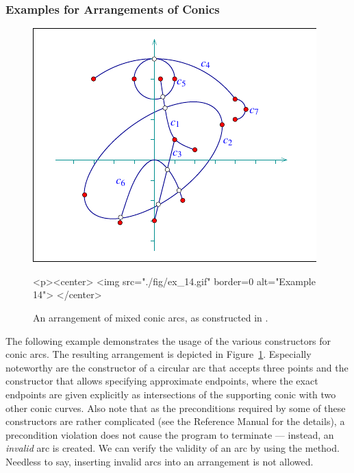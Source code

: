 \subsubsection{Examples for Arrangements of Conics}

\begin{figure}[t]
\begin{ccTexOnly}
  \begin{center}
  \includegraphics{Arrangement_on_surface_2/fig/ex_14}
  \end{center}
\end{ccTexOnly}
\begin{ccHtmlOnly}
  <p><center>
  <img src="./fig/ex_14.gif" border=0 alt="Example 14">
  </center>
\end{ccHtmlOnly}
\caption{An arrangement of mixed conic arcs, as constructed in
.\label{arr_fig:ex_14}}
\end{figure}

The following example demonstrates the usage of the various
constructors for conic arcs. The resulting arrangement is depicted
in Figure~\ref{arr_fig:ex_14}. Especially noteworthy are the
constructor of a circular arc that accepts three points and the
constructor that allows specifying approximate endpoints, where the
exact endpoints are given explicitly as intersections of
the supporting conic with two other conic curves. Also note that as the
preconditions required by some of these constructors are rather
complicated (see the Reference Manual for the details), a
precondition violation does not cause the program to terminate ---
instead, an {\em invalid} arc is created. We can verify the validity
of an arc by using the  method. Needless to say, inserting
invalid arcs into an arrangement is not allowed.

